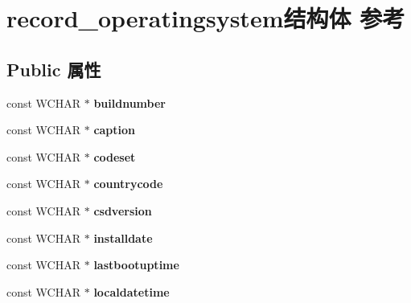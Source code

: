\hypertarget{structrecord__operatingsystem}{}\section{record\+\_\+operatingsystem结构体 参考}
\label{structrecord__operatingsystem}
\subsection*{Public 属性}
\begin{DoxyCompactItemize}
\item 
\mbox{\label{structrecord__operatingsystem_a34580f9ca2d837336438b3cd4ff837ce}} 
const W\+C\+H\+AR $\ast$ {\bfseries buildnumber}
\item 
\mbox{\label{structrecord__operatingsystem_ac589f100c0d596b5656d7edf0585bb9d}} 
const W\+C\+H\+AR $\ast$ {\bfseries caption}
\item 
\mbox{\label{structrecord__operatingsystem_aa921ec004a2989b7e26dd9f1b90fb498}} 
const W\+C\+H\+AR $\ast$ {\bfseries codeset}
\item 
\mbox{\label{structrecord__operatingsystem_ab9d2955c91c7314bd0c21e034d8548ed}} 
const W\+C\+H\+AR $\ast$ {\bfseries countrycode}
\item 
\mbox{\label{structrecord__operatingsystem_a28d5c54db2ff272db91258621159df50}} 
const W\+C\+H\+AR $\ast$ {\bfseries csdversion}
\item 
\mbox{\label{structrecord__operatingsystem_a08a2b1b82311c78324a18463e65a7ee9}} 
const W\+C\+H\+AR $\ast$ {\bfseries installdate}
\item 
\mbox{\label{structrecord__operatingsystem_ac1b2c7deb41e79bfa439c8fdb37bdcf6}} 
const W\+C\+H\+AR $\ast$ {\bfseries lastbootuptime}
\item 
\mbox{\label{structrecord__operatingsystem_a4d4e1963afbe05cfd1fe7116ba06ec09}} 
const W\+C\+H\+AR $\ast$ {\bfseries localdatetime}

\end{DoxyCompactItemize}
